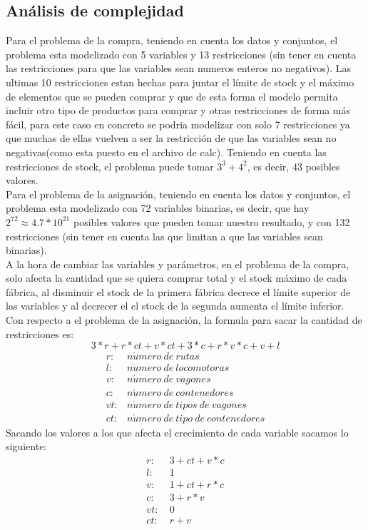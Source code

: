 \documentclass[11pt,spanish]{article}
\begin{document}
		\subsection{Análisis de complejidad}
		Para el problema de la compra, teniendo en cuenta los datos y conjuntos, el problema esta modelizado con 5 variables y 13 restricciones (sin tener en cuenta las restricciones para que las variables sean numeros enteros no negativos). Las ultimas 10 restricciones estan hechas para juntar el límite de stock y el máximo de elementos que se pueden comprar y que de esta forma el modelo permita incluir otro tipo de productos para comprar y otras restricciones de forma más fácil, para este caso en concreto se podria modelizar con solo 7 restricciones ya que muchas de ellas vuelven a ser la restricción de que las variables sean no negativas(como esta puesto en el archivo de calc). Teniendo en cuenta las restricciones de stock, el problema puede tomar $3^3+4^2$, es decir, 43 posibles valores.\\
		Para el problema de la asignación, teniendo en cuenta los datos y conjuntos, el problema esta modelizado con 72 variables binarias, es decir, que hay $2^{72}\approx4.7*10^{21}$ posibles valores que pueden tomar nuestro resultado, y con 132 restricciones (sin tener en cuenta las que limitan a que las variables sean binarias).\\
		A la hora de cambiar las variables y parámetros, en el problema de la compra, solo afecta la cantidad que se quiera comprar total y el stock máximo de cada fábrica, al disminuir el stock de la primera fábrica decrece el límite superior de las variables y al decrecer el el stock de la segunda aumenta el límite inferior. Con respecto a el problema de la asignación, la formula para sacar la cantidad de restricciones es: 
		$$
		3*r+r*ct+v*ct+3*c+r*v*c+v+l
		$$
		\begin{align*}
			r:& n\acute{u}mero\ de\ rutas\\
			l:& n\acute{u}mero\ de\ locomotoras\\
			v:& n\acute{u}mero\ de\ vagones\\
			c:& n\acute{u}mero\ de\ contenedores\\
			vt:& n\acute{u}mero\ de\ tipos\ de\ vagones\\
			ct:& n\acute{u}mero\ de\ tipo\ de\ contenedores
		\end{align*}
		Sacando los valores a los que afecta el crecimiento de cada variable sacamos lo siguiente:
		\begin{align*}
			r:&\ 3+ct+v*c\\
			l:&\ 1\\
			v:&\ 1+ct+r*c\\
			c:&\ 3+r*v\\
			vt:&\ 0\\
			ct:&\ r+v
		\end{align*}
\end{document}
